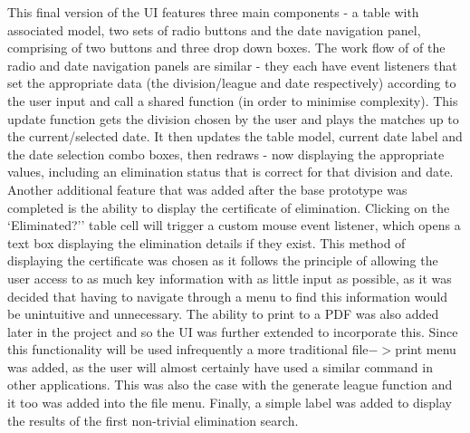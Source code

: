 This final version of the UI features three main components - a table with
associated model,  two sets of radio buttons and the date navigation panel,
comprising of two buttons and three drop down boxes. The work flow of of the
radio and date navigation panels are similar - they each have event listeners
that set the appropriate data (the division/league and date respectively)
according to the user input and call a shared function  (in order to minimise
complexity). This update function gets the division chosen by the user and plays
the matches up to the current/selected date. It then updates the table model,
current date label and the date selection combo boxes, then redraws - now
displaying the appropriate values, including an elimination status that is
correct for that division and date. Another additional feature that was added
after the base prototype was completed is the ability to display the certificate
of elimination. Clicking on the `Eliminated?'' table cell will trigger a custom
mouse event listener, which opens a  text box displaying the elimination details
if they exist. This method of displaying the certificate was chosen as it
follows the principle of allowing the user access to as much key information
with as little input as possible, as it was decided that having to navigate
through a menu to find this  information would be unintuitive and unnecessary.
The ability to print to a PDF was also added later in the project and so the UI
was further extended to incorporate this. Since this functionality will be used
infrequently a more traditional file$-$$>$print menu was added, as the user will
almost certainly have used a similar command in other applications. This was also
the case with the generate league function and it too was added into the file menu.
Finally, a simple label was added to display the results of the first non-trivial
elimination search.
